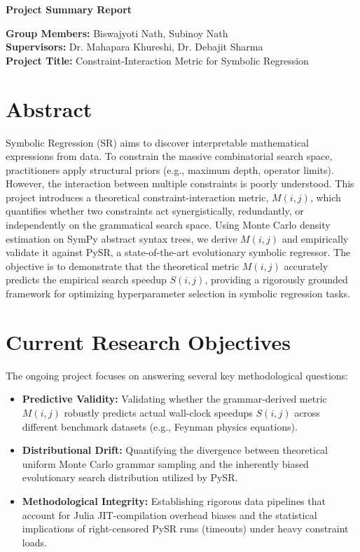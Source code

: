 \documentclass[11pt,a4paper]{article}
\begin{document}
\begin{center}
    \LARGE\textbf{Project Summary Report}\\[0.5cm]
\end{center}

\noindent\textbf{Group Members:} Biswajyoti Nath, Subinoy Nath \\
\textbf{Supervisors:} Dr. Mahapara Khureshi, Dr. Debajit Sharma \\
\textbf{Project Title:} Constraint-Interaction Metric for Symbolic Regression

\vspace{0.5cm}

\section*{Abstract}
Symbolic Regression (SR) aims to discover interpretable mathematical expressions from data. To constrain the massive combinatorial search space, practitioners apply structural priors (e.g., maximum depth, operator limits). However, the interaction between multiple constraints is poorly understood. This project introduces a theoretical constraint-interaction metric, $M(i,j)$, which quantifies whether two constraints act synergistically, redundantly, or independently on the grammatical search space. Using Monte Carlo density estimation on SymPy abstract syntax trees, we derive $M(i,j)$ and empirically validate it against PySR, a state-of-the-art evolutionary symbolic regressor. The objective is to demonstrate that the theoretical metric $M(i,j)$ accurately predicts the empirical search speedup $S(i,j)$, providing a rigorously grounded framework for optimizing hyperparameter selection in symbolic regression tasks.

\section*{Current Research Objectives}
The ongoing project focuses on answering several key methodological questions:
\begin{itemize}[leftmargin=*]
    \item \textbf{Predictive Validity:} Validating whether the grammar-derived metric $M(i,j)$ robustly predicts actual wall-clock speedups $S(i,j)$ across different benchmark datasets (e.g., Feynman physics equations).
    \item \textbf{Distributional Drift:} Quantifying the divergence between theoretical uniform Monte Carlo grammar sampling and the inherently biased evolutionary search distribution utilized by PySR.
    \item \textbf{Methodological Integrity:} Establishing rigorous data pipelines that account for Julia JIT-compilation overhead biases and the statistical implications of right-censored PySR runs (timeouts) under heavy constraint loads.
\end{itemize}
\end{document}
